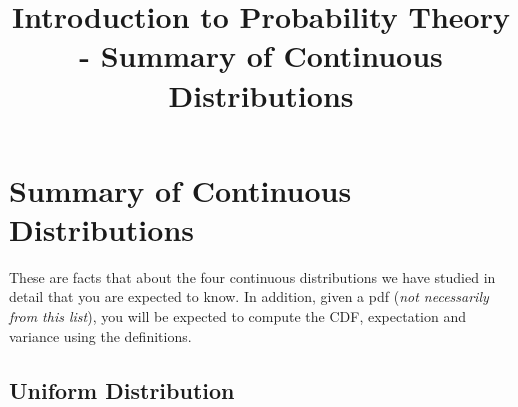 \documentclass[12pt]{article} %
\date{}
\title{Introduction to Probability Theory - Summary of Continuous Distributions}
\begin{document}
\maketitle

\section{Summary of Continuous Distributions}
These are facts that about the four continuous distributions we have studied in detail that you are expected to know. In addition, given a pdf (\emph{not necessarily from this list}), you will be expected to compute the CDF, expectation and variance using the definitions.
\subsection{Uniform Distribution}
\end{document}
